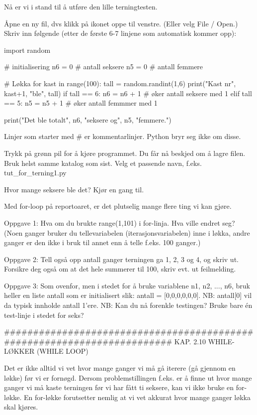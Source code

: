 {Nå er vi i stand til å utføre den lille terningtesten. 

Åpne en ny fil, dvs klikk på ikonet oppe til venstre. (Eller velg File / Open.)
Skriv inn følgende (etter de første 6-7 linjene som automatisk kommer opp): 

import random

# initialisering
n6 = 0  # antall seksere
n5 = 0  # antall femmere

# Løkka 
for kast in range(100):
    tall = random.randint(1,6)
    print("Kast nr", kast+1, "ble", tall)
    if tall == 6:
       n6 = n6 + 1    # øker antall seksere med 1
    elif tall == 5:
       n5 = n5 + 1    # øker antall femmmer med 1

print("Det ble totalt", n6, "seksere og", n5, "femmere.")


Linjer som starter med # er kommentarlinjer. 
Python bryr seg ikke om disse. 

Trykk på grønn pil for å kjøre programmet.
Du får nå beskjed om å lagre filen. Bruk helst samme katalog som sist.
Velg et passende navn, f.eks. tut_for_terning1.py

Hvor mange seksere ble det?
Kjør en gang til.

Med for-loop på reportoaret, er det plutselig mange flere ting vi kan gjøre. 



Oppgave 1: Hva om du brukte range(1,101) i for-linja. Hva ville endret seg?
(Noen ganger bruker du tellevariabelen (iterasjonsvariabelen) inne i løkka,
andre ganger er den ikke i bruk til annet enn å telle f.eks. 100 ganger.) 


Oppgave 2: Tell også opp antall ganger terningen ga 1, 2, 3 og 4, og skriv ut.
Forsikre deg også om at det hele summerer til 100, skriv evt. ut feilmelding. 


Oppgave 3: Som ovenfor, men i stedet for å bruke variablene n1, n2, ..., n6,
bruk heller en liste antall som er initialisert slik: antall = [0,0,0,0,0,0].
NB: antall[0] vil da typisk innholde antall 1'ere. 
NB: Kan du nå forenkle testingen? Bruke bare én test-linje i stedet for seks? 

######################################################################## 
KAP. 2.10  WHILE-LØKKER (WHILE LOOP)

Det er ikke alltid vi vet hvor mange ganger vi må gå iterere (gå gjennom en løkke)
før vi er fornøgd.
Dersom problemstillingen f.eks. er å finne ut hvor mange ganger vi må kaste terningen
før vi har fått ti seksere, kan vi ikke bruke en for-løkke.
En for-løkke forutsetter nemlig at vi vet akkurat hvor mange ganger løkka skal kjøres.

}
